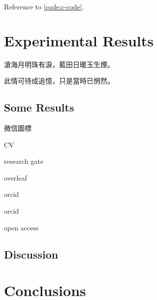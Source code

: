 Reference to \cref{code:c-code}.  

\section{Experimental Results}
\label{ch6:sec:Experimental Results}

\noindent
\begin{minipage}{0.5\textwidth}
滄海月明珠有淚，藍田日暖玉生煙。
\end{minipage}%
\begin{minipage}{0.5\textwidth}
此情可待成追憶，只是當時已惘然。
\end{minipage}

\subsection{Some Results}
\label{ch6:subsec:Some Results}

微信圖標 

CV \aiCV

research gate \aiResearchGate

overleaf \aiOverleaf

orcid \aiOrcid

orcid \href{http://orcid.org/0000-0003-0550-4024}{\textcolor{orcidlogocol}{\aiOrcid}}

open access \aiOpenAccess

\subsection{Discussion}
\label{ch6:subsec:Discussion}

\section{Conclusions}
\label{ch6:sec:Conclusions}